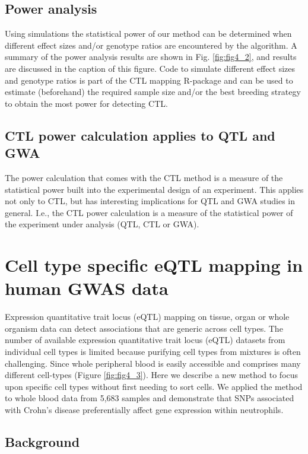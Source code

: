   \subsection{Power analysis}
  Using simulations the statistical power of our method can be determined when different effect sizes and/or genotype ratios 
  are encountered by the algorithm. A summary of the power analysis results are shown in Fig. \ref{fig:fig4_2}, and results 
  are discussed in the caption of this figure. 
  Code to simulate different effect sizes and genotype ratios is part of the CTL mapping R-package and can be used 
  to estimate (beforehand) the required sample size and/or the best breeding strategy to obtain the most power for detecting 
  CTL.

  \subsection{CTL power calculation applies to QTL and GWA}
  The power calculation that comes with the CTL method is a measure of the statistical power built into the experimental design 
  of an experiment. This applies not only to CTL, but has interesting implications for QTL and GWA studies in general. I.e., 
  the CTL power calculation is a measure of the statistical power of the experiment under analysis (QTL, CTL or GWA).


\section{Cell type specific eQTL mapping in human GWAS data}
\label{sec:cellspecificeqtl}
  Expression quantitative trait locus (eQTL) mapping on tissue, organ or whole organism data can detect associations that 
  are generic across cell types.  The number of available expression quantitative trait locus (eQTL) datasets from individual 
  cell types is limited because purifying cell types from mixtures is often challenging.  Since whole peripheral blood is 
  easily accessible and comprises many different cell-types (Figure \ref{fig:fig4_3}). Here we describe a new method to 
  focus upon specific cell types without first needing to sort  cells. We applied the method to whole blood data from 
  5,683 samples and demonstrate that SNPs associated with Crohn's  disease preferentially affect gene expression within neutrophils.
  \subsection{Background}

